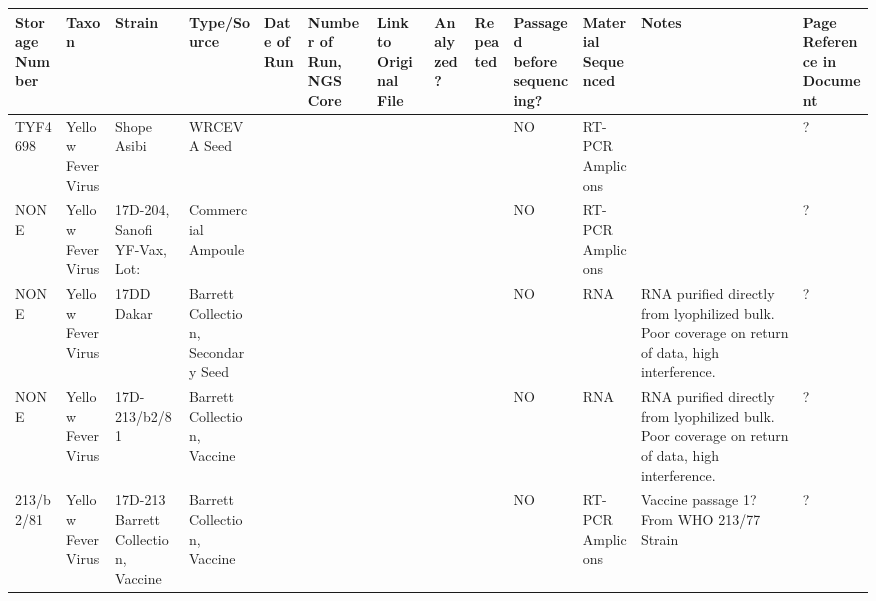\begin{longtable}{@{}lllllllllllll@{}}
\toprule
Storage Number & Taxon              & Strain                                    & Type/Source                            & Date of Run & Number of Run, NGS Core & Link to Original File & Analyzed? & Repeated & Passaged before sequencing? & Material Sequenced & Notes                                                                                            & Page Reference in Document \\ \midrule
TYF4698        & Yellow Fever Virus & Shope Asibi                               & WRCEVA Seed                            &             &                         &                       &           &          & NO                          & RT-PCR Amplicons   &                                                                                                  & ?                          \\
NONE           & Yellow Fever Virus & 17D-204, Sanofi YF-Vax, Lot:              & Commercial Ampoule                     &             &                         &                       &           &          & NO                          & RT-PCR Amplicons   &                                                                                                  & ?                          \\
NONE           & Yellow Fever Virus & 17DD Dakar                                & Barrett Collection, Secondary Seed     &             &                         &                       &           &          & NO                          & RNA                & RNA purified directly from lyophilized bulk. Poor coverage on return of data, high interference. & ?                          \\
NONE           & Yellow Fever Virus & 17D-213/b2/81                             & Barrett Collection, Vaccine            &             &                         &                       &           &          & NO                          & RNA                & RNA purified directly from lyophilized bulk. Poor coverage on return of data, high interference. & ?                          \\
213/b2/81      & Yellow Fever Virus & 17D-213 Barrett Collection, Vaccine       & Barrett Collection, Vaccine            &             &                         &                       &           &          & NO                          & RT-PCR Amplicons   & Vaccine passage 1? From WHO 213/77 Strain                                                        & ?                          \\

\end{longtable}
